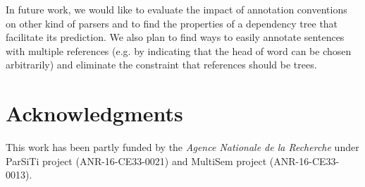 \documentclass[11pt,letterpaper]{article}
\begin{document}
In future work, we would like to evaluate the impact of annotation
conventions on other kind of parsers and to find the properties of a
dependency tree that facilitate its prediction. We also plan to find
ways to easily annotate sentences with multiple references (e.g. by
indicating that the head of word can be chosen arbitrarily) and
eliminate the constraint that references should be trees.

\section*{Acknowledgments}

This work has been partly funded by the \textit{Agence Nationale de la
  Recherche} under ParSiTi project (ANR-16-CE33-0021) and MultiSem
project (ANR-16-CE33-0013).



\end{document}
